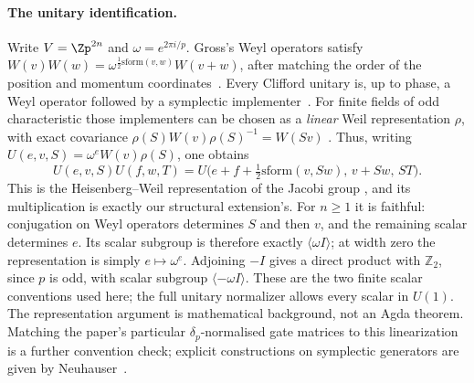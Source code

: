 \paragraph{The unitary identification.}
Write $V=\Zp^{2n}$ and $\omega=e^{2\pi i/p}$.  Gross's Weyl
operators satisfy $W(v)W(w)=\omega^{\frac12\mathrm{sform}(v,w)}
W(v+w)$, after matching the order of the position and momentum
coordinates~\cite[\S II.1, Eq.~(4)]{gross2006hudson}.
Every Clifford unitary is, up to phase, a Weyl operator followed by
a symplectic implementer~\cite[Theorem~3]{gross2006hudson}.
For finite fields of odd characteristic those implementers can be
chosen as a \emph{linear} Weil representation $\rho$, with exact
covariance $\rho(S)W(v)\rho(S)^{-1}=W(Sv)$
\cite[Theorem~1.3.2]{gurevich2007geometric}.
Thus, writing $U(e,v,S)=\omega^e W(v)\rho(S)$, one obtains
\[
 U(e,v,S)U(f,w,T)
 =U\bigl(e+f+\tfrac12\mathrm{sform}(v,Sw),\,v+Sw,\,ST\bigr).
\]
This is the Heisenberg--Weil representation of the Jacobi group
\cite[\S 1.3]{gurevich2010bounds}, and its multiplication is exactly
our structural extension's.  For $n\geq1$ it is faithful: conjugation
on Weyl operators determines $S$ and then $v$, and the remaining
scalar determines $e$.  Its scalar subgroup is therefore exactly
$\langle\omega I\rangle$; at width zero the representation is simply
$e\mapsto\omega^e$.
Adjoining $-I$ gives a direct product with $\mathbb Z_2$, since $p$ is
odd, with scalar subgroup $\langle-\omega I\rangle$.
These are the two finite scalar conventions used here; the full
unitary normalizer allows every scalar in $U(1)$.
The representation argument is mathematical background, not an Agda
theorem.  Matching the paper's particular $\delta_p$-normalised gate
matrices to this linearization is a further convention check; explicit
constructions on symplectic generators are given by
Neuhauser~\cite{neuhauser2002metaplectic}.

